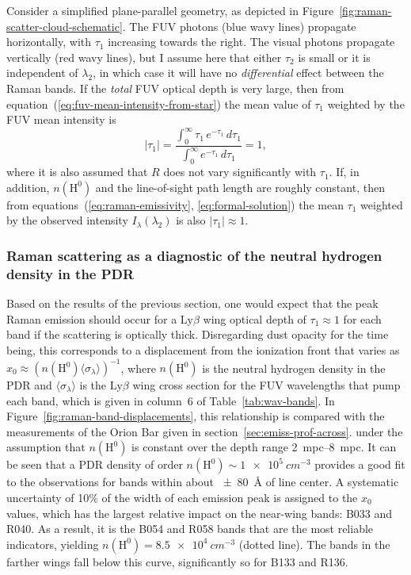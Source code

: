 \documentclass[useAMS, usenatbib, a4paper]{mnras}
\newcommand*\chem[1]{\ensuremath{\mathrm{#1}}}
\newcommand\lyb{\ensuremath{\text{Ly}\beta}}
\begin{document}
Consider a simplified plane-parallel geometry, as depicted in Figure~\ref{fig:raman-scatter-cloud-schematic}.
The FUV photons (blue wavy lines) propagate horizontally,
with \(\tau_1\) increasing towards the right.
The visual photons propagate vertically (red wavy lines), but I assume here that
either \(\tau_2\) is small or it is independent of \(\lambda_2\),
in which case it will have no \emph{differential} effect between the Raman bands.
If the \emph{total} FUV optical depth is very large,
then from equation~(\ref{eq:fuv-mean-intensity-from-star})
the mean value of \(\tau_1\) weighted by the FUV mean intensity is
\begin{equation}
  \label{eq:tau1-equals-unity}
  \vert \tau_1 \vert = \frac {\int_0^\infty \tau_1 \, e^{-\tau_1} \, d\tau_1}  {\int_0^\infty e^{-\tau_1} \, d\tau_1} = 1 , 
\end{equation}
where it is also assumed that \(R\) does not vary significantly with \(\tau_1\).
If, in addition, \(n(\chem{H^0})\) and the line-of-sight path length are roughly constant,
then from equations~(\ref{eq:raman-emissivity}, \ref{eq:formal-solution})
the mean \(\tau_1\) weighted by the observed intensity \(I_\lambda(\lambda_2)\) is also \(\vert \tau_1 \vert \approx 1\).

\subsubsection{Raman scattering as a diagnostic of
  the neutral hydrogen density in the PDR}
\label{sec:raman-scattering-as}

Based on the results of the previous section,
one would expect that the peak Raman emission should occur for a
\lyb{} wing optical depth of \(\tau_1 \approx 1\) for each band if the scattering is optically thick.
Disregarding dust opacity for the time being,
this corresponds to a displacement from the ionization front that varies as
\(x_0 \approx (n(\chem{H^0}) \langle \sigma_\lambda \rangle)^{-1}\), where \(n(\chem{H^0})\) is the neutral hydrogen
density in the PDR and \(\langle \sigma_\lambda \rangle\) is the \lyb{} wing cross section
for the FUV wavelengths that pump each band, which is given in
column~6 of Table~\ref{tab:wav-bands}.
In Figure~\ref{fig:raman-band-displacements}, this relationship is
compared with the measurements of the Orion Bar given in section~\ref{sec:emiss-prof-across}.
under the assumption that \(n(\chem{H^0})\) is constant over the depth range
\SIrange{2}{8}{mpc}.
It can be seen that a PDR density of order
\(n(\chem{H^0}) \sim \SI{1e5}{cm^{-3}}\) provides a good fit to
the observations for bands within about \SI{\pm 80}{\angstrom} of line center.
A systematic uncertainty of 10\% of the width of each emission peak is
assigned to the \(x_0\) values, which has the largest relative impact
on the near-wing bands: B033 and R040.  As a result, it is the B054
and R058 bands that are the most reliable indicators, yielding
\(n(\chem{H^0}) = \SI{8.5e4}{cm^{-3}}\) (dotted line).  The bands in the farther
wings fall below this curve, significantly so for B133 and R136.
\end{document}
